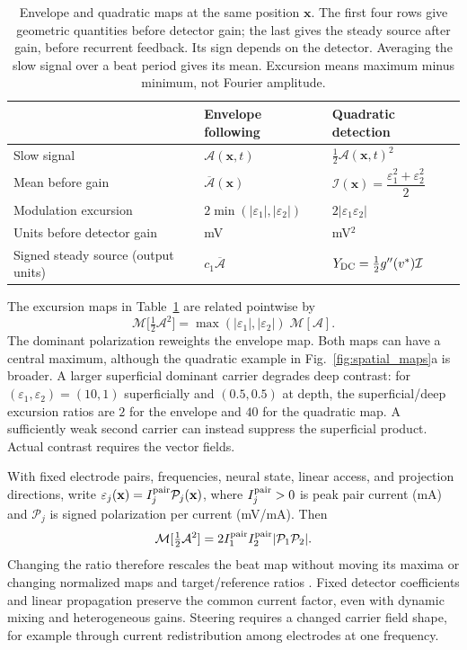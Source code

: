 \begin{table}[ht]
\centering\small
\renewcommand{\arraystretch}{1.4}
\begin{tabular}{@{}>{\raggedright\arraybackslash}p{}
 >{\raggedright\arraybackslash}p{}
 >{\raggedright\arraybackslash}p{}@{}}
\toprule
 & Envelope following & Quadratic detection \\
\midrule
Slow signal & $\mathcal A(\mathbf x,t)$ & $\tfrac12\mathcal A(\mathbf x,t)^2$ \\
Mean before gain & $\overline{\mathcal A}(\mathbf x)$
 & $\mathcal I(\mathbf x)=\dfrac{\varepsilon_1^2+\varepsilon_2^2}{2}$ \\
Modulation excursion & $2\min(|\varepsilon_1|,|\varepsilon_2|)$
 & $2|\varepsilon_1\varepsilon_2|$ \\
Units before detector gain & mV & mV$^2$ \\
Signed steady source (output units) & $c_1\overline{\mathcal A}$
 & $Y_{\rm DC}=\tfrac12g''(v^*)\mathcal I$ \\
\bottomrule
\end{tabular}
\caption{Envelope and quadratic maps at the same position $\mathbf x$.
The first four rows give geometric quantities before detector gain; the last
gives the steady source after gain, before recurrent feedback. Its sign depends
on the detector. Averaging the slow signal over a beat period gives its mean.
Excursion means maximum minus minimum, not Fourier amplitude.}
\label{tab:transduction-maps}
\end{table}

The excursion maps in Table~\ref{tab:transduction-maps} are related pointwise by
\begin{equation}
\mathcal{M}\big[\tfrac12\mathcal A^2\big]=\max(|\varepsilon_1|,|\varepsilon_2|)\;\mathcal{M}[\mathcal A].
\label{eq:reweight}
\end{equation}
The dominant polarization reweights the envelope map. Both maps can have a
central maximum, although the quadratic example in Fig.~\ref{fig:spatial_maps}a
is broader. A larger superficial dominant carrier degrades deep contrast:
for $(\varepsilon_1,\varepsilon_2)=(10,1)$ superficially and $(0.5,0.5)$
at depth, the superficial/deep excursion ratios are $2$ for the envelope
and $40$ for the quadratic map. A sufficiently weak second carrier can
instead suppress the superficial product. Actual contrast requires the
vector fields.

With fixed electrode pairs, frequencies, neural state, linear access, and
projection directions, write
$\varepsilon_j(\mathbf x)=I_j^{\rm pair}\mathcal P_j(\mathbf x)$,
where $I_j^{\rm pair}>0$ is peak pair current (mA) and $\mathcal P_j$ is
signed polarization per current (mV/mA). Then
\[
\mathcal M[\tfrac12\mathcal A^2]
=2I_1^{\rm pair}I_2^{\rm pair}|\mathcal P_1\mathcal P_2|.
\]
Changing the ratio therefore rescales the beat map without moving its maxima
or changing normalized maps and target/reference ratios
\cite{cassara2025part2}. Fixed detector coefficients and linear propagation
preserve the common current factor, even with dynamic mixing and heterogeneous
gains. Steering requires a changed carrier field shape, for example through
current redistribution among electrodes at one frequency.

